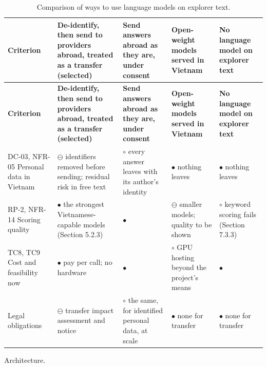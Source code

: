 {\small{}\renewcommand{\arraystretch}{1.1}
\begin{longtable}{|>{\raggedright\arraybackslash}p{}|>{\raggedright\arraybackslash}p{}|>{\raggedright\arraybackslash}p{}|>{\raggedright\arraybackslash}p{}|>{\raggedright\arraybackslash}p{}|}
\caption{Comparison of ways to use language models on explorer text.} \\
\hline
\textbf{Criterion} & \textbf{De-\allowbreak{}identify, then send to providers abroad, treated as a transfer (selected)} & \textbf{Send answers abroad as they are, under consent} & \textbf{Open-weight models served in Vietnam} & \textbf{No language model on explorer text} \\ \hline
\endfirsthead
\hline
\textbf{Criterion} & \textbf{De-\allowbreak{}identify, then send to providers abroad, treated as a transfer (selected)} & \textbf{Send answers abroad as they are, under consent} & \textbf{Open-weight models served in Vietnam} & \textbf{No language model on explorer text} \\ \hline
\endhead
DC-03, NFR-05 Personal data in Vietnam & $\ominus$ identifiers removed before sending; residual risk in free text & $\circ$ every answer leaves with its author's identity & $\bullet$ nothing leaves & $\bullet$ nothing leaves \\ \hline
RP-2, NFR-14 Scoring quality & $\bullet$ the strongest Vietnamese-\allowbreak{}capable models (Section 5.2.3) & $\bullet$ & $\ominus$ smaller models; quality to be shown & $\circ$ keyword scoring fails (Section 7.3.3) \\ \hline
TC8, TC9 Cost and feasibility now & $\bullet$ pay per call; no hardware & $\bullet$ & $\circ$ GPU hosting beyond the project's means & $\bullet$ \\ \hline
Legal obligations & $\ominus$ transfer impact assessment and notice & $\circ$ the same, for identified personal data, at scale & $\bullet$ none for transfer & $\bullet$ none for transfer \\ \hline
\end{longtable}
}

Architecture.

